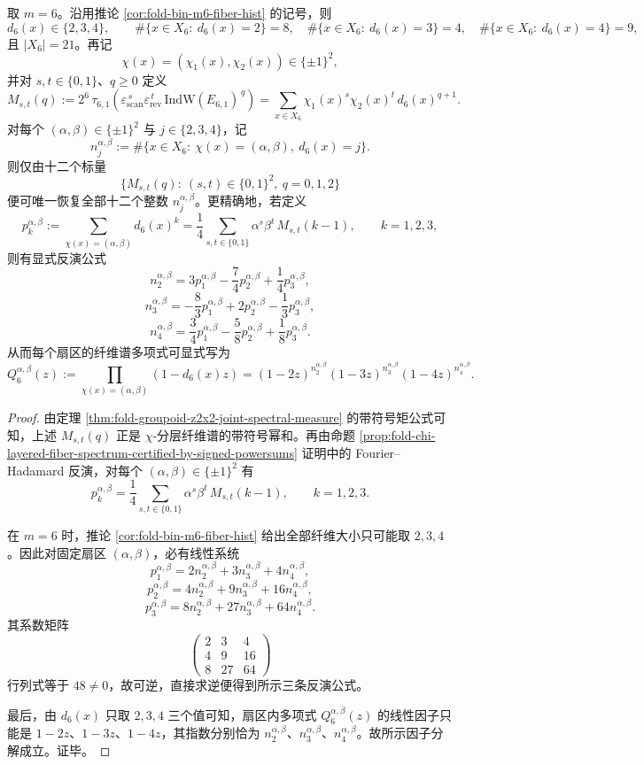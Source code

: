 \begin{theorem}\label{thm:fold-window6-chi-layered-spectrum-reconstruction-by-12-moments}
取 \(m=6\)。沿用推论 \ref{cor:fold-bin-m6-fiber-hist} 的记号，则
\[
d_6(x)\in\{2,3,4\},
\qquad
\#\{x\in X_6:\ d_6(x)=2\}=8,\quad
\#\{x\in X_6:\ d_6(x)=3\}=4,\quad
\#\{x\in X_6:\ d_6(x)=4\}=9,
\]
且 \(|X_6|=21\)。再记
\[
\chi(x)=(\chi_1(x),\chi_2(x))\in\{\pm1\}^2,
\]
并对 \(s,t\in\{0,1\}\)、\(q\ge 0\) 定义
\[
M_{s,t}(q)
:=
2^6\,\tau_{6,1}\!\left(
\varepsilon_{\mathrm{scan}}^{\,s}\varepsilon_{\mathrm{rev}}^{\,t}\,
\mathrm{IndW}(E_{6,1})^{\,q}
\right)
=
\sum_{x\in X_6}\chi_1(x)^s\chi_2(x)^t\,d_6(x)^{q+1}.
\]
对每个 \((\alpha,\beta)\in\{\pm1\}^2\) 与 \(j\in\{2,3,4\}\)，记
\[
n_j^{\alpha,\beta}
:=
\#\{x\in X_6:\ \chi(x)=(\alpha,\beta),\ d_6(x)=j\}.
\]
则仅由十二个标量
\[
\{M_{s,t}(q):\ (s,t)\in\{0,1\}^2,\ q=0,1,2\}
\]
便可唯一恢复全部十二个整数 \(n_j^{\alpha,\beta}\)。更精确地，若定义
\[
p_k^{\alpha,\beta}
:=
\sum_{\chi(x)=(\alpha,\beta)} d_6(x)^k
=
\frac14\sum_{s,t\in\{0,1\}}\alpha^s\beta^t\,M_{s,t}(k-1),
\qquad k=1,2,3,
\]
则有显式反演公式
\[
n_2^{\alpha,\beta}
=
3p_1^{\alpha,\beta}-\frac74p_2^{\alpha,\beta}+\frac14p_3^{\alpha,\beta},
\]
\[
n_3^{\alpha,\beta}
=
-\frac83p_1^{\alpha,\beta}+2p_2^{\alpha,\beta}-\frac13p_3^{\alpha,\beta},
\]
\[
n_4^{\alpha,\beta}
=
\frac34p_1^{\alpha,\beta}-\frac58p_2^{\alpha,\beta}+\frac18p_3^{\alpha,\beta}.
\]
从而每个扇区的纤维谱多项式可显式写为
\[
Q_6^{\alpha,\beta}(z)
:=
\prod_{\chi(x)=(\alpha,\beta)}(1-d_6(x)z)
=
(1-2z)^{n_2^{\alpha,\beta}}(1-3z)^{n_3^{\alpha,\beta}}(1-4z)^{n_4^{\alpha,\beta}}.
\]
\end{theorem}
\begin{proof}
由定理 \ref{thm:fold-groupoid-z2x2-joint-spectral-measure} 的带符号矩公式可知，上述 \(M_{s,t}(q)\) 正是 \(\chi\)-分层纤维谱的带符号幂和。再由命题 \ref{prop:fold-chi-layered-fiber-spectrum-certified-by-signed-powersums} 证明中的 Fourier--Hadamard 反演，对每个 \((\alpha,\beta)\in\{\pm1\}^2\) 有
\[
p_k^{\alpha,\beta}
=
\frac14\sum_{s,t\in\{0,1\}}\alpha^s\beta^t\,M_{s,t}(k-1),
\qquad k=1,2,3.
\]

在 \(m=6\) 时，推论 \ref{cor:fold-bin-m6-fiber-hist} 给出全部纤维大小只可能取 \(2,3,4\)。因此对固定扇区 \((\alpha,\beta)\)，必有线性系统
\[
p_1^{\alpha,\beta}=2n_2^{\alpha,\beta}+3n_3^{\alpha,\beta}+4n_4^{\alpha,\beta},
\]
\[
p_2^{\alpha,\beta}=4n_2^{\alpha,\beta}+9n_3^{\alpha,\beta}+16n_4^{\alpha,\beta},
\]
\[
p_3^{\alpha,\beta}=8n_2^{\alpha,\beta}+27n_3^{\alpha,\beta}+64n_4^{\alpha,\beta}.
\]
其系数矩阵
\[
\begin{pmatrix}
2&3&4\\
4&9&16\\
8&27&64
\end{pmatrix}
\]
行列式等于 \(48\neq 0\)，故可逆，直接求逆便得到所示三条反演公式。

最后，由 \(d_6(x)\) 只取 \(2,3,4\) 三个值可知，扇区内多项式 \(Q_6^{\alpha,\beta}(z)\) 的线性因子只能是 \(1-2z\)、\(1-3z\)、\(1-4z\)，其指数分别恰为 \(n_2^{\alpha,\beta}\)、\(n_3^{\alpha,\beta}\)、\(n_4^{\alpha,\beta}\)。故所示因子分解成立。证毕。
\end{proof}

